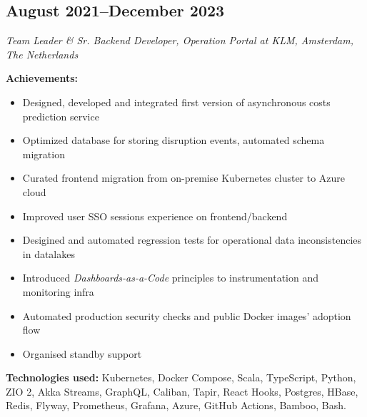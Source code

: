 \subsection*{August 2021--December 2023}

\textit{Team Leader \& Sr. Backend Developer, Operation Portal at KLM, Amsterdam, The Netherlands}

\textbf{Achievements:}

\begin{itemize}[noitemsep]
  \item Designed, developed and integrated first version of asynchronous costs prediction service
  \item Optimized database for storing disruption events, automated schema migration
  \item Curated frontend migration from on-premise Kubernetes cluster to Azure cloud
  \item Improved user SSO sessions experience on frontend/backend
  \item Desigined and automated regression tests for operational data inconsistencies in datalakes
  \item Introduced \textit{Dashboards-as-a-Code} principles to instrumentation and monitoring infra
  \item Automated production security checks and public Docker images' adoption flow
  \item Organised standby support
\end{itemize}

\textbf{Technologies used:}
Kubernetes, Docker Compose, Scala, TypeScript, Python, ZIO 2, Akka Streams, GraphQL, Caliban, Tapir,
React Hooks, Postgres, HBase, Redis, Flyway, Prometheus, Grafana, Azure, GitHub Actions, Bamboo, Bash.
